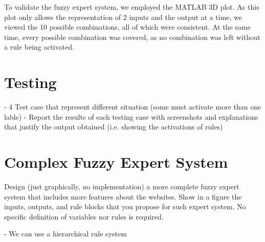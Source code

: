 \documentclass[11pt]{article}
\begin{document}
To validate the fuzzy expert system, we employed the MATLAB 3D plot. As this plot only allows the representation of 2 inputs and the output at a time, we viewed the 10 possible combinations, all of which were consistent. At the same time, every possible combination was covered, as no combination was left without a rule being activated.

\section{Testing}
- 4 Test case that represent different situation (some must activate more than one lable)
- Report the results of each testing case with 
screenshots  and  explanations  that  justify the output  obtained  (i.e.  showing  the  activations of  
rules)

\section{Complex Fuzzy Expert System}
Design (just graphically, no implementation) a more complete fuzzy expert system that 
includes more features about the websites. Show in a figure the inputs, outputs, and rule blocks 
that you propose for such expert system. No specific definition of variables nor rules is required. 

- We can use a hierarchical rule system

\newpage
\printbibliography
\end{document}
